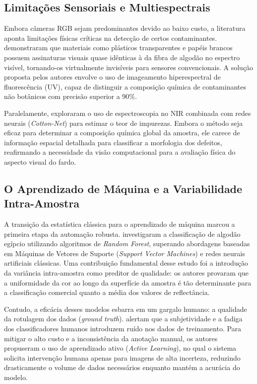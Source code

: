 \subsection{Limitações Sensoriais e Multiespectrais}

    Embora câmeras RGB sejam predominantes devido ao baixo custo, a literatura aponta limitações físicas críticas na detecção de certos contaminantes.  demonstraram que materiais como plásticos transparentes e papéis brancos possuem assinaturas visuais quase idênticas à da fibra de algodão no espectro visível, tornando-os virtualmente invisíveis para sensores convencionais. A solução proposta pelos autores envolve o uso de imageamento hiperespectral de fluorescência (UV), capaz de distinguir a composição química de contaminantes não botânicos com precisão superior a 90\%.

    Paralelamente,  exploraram o uso de espectroscopia no NIR combinada com redes neurais (\textit{Cotton-Net}) para estimar o teor de impurezas. Embora o método seja eficaz para determinar a composição química global da amostra, ele carece de informação espacial detalhada para classificar a morfologia dos defeitos, reafirmando a necessidade da visão computacional para a avaliação física do aspecto visual do fardo.

\subsection{O Aprendizado de Máquina e a Variabilidade Intra-Amostra}

    A transição da estatística clássica para o aprendizado de máquina marcou a primeira etapa da automação robusta.  investigaram a classificação de algodão egípcio utilizando algoritmos de \textit{Random Forest}, superando abordagens baseadas em Máquinas de Vetores de Suporte (\textit{Support Vector Machines}) e redes neurais artificiais clássicas. Uma contribuição fundamental desse estudo foi a introdução da variância intra-amostra como preditor de qualidade: os autores provaram que a uniformidade da cor ao longo da superfície da amostra é tão determinante para a classificação comercial quanto a média dos valores de reflectância.

    Contudo, a eficácia desses modelos esbarra em um gargalo humano: a qualidade da rotulagem dos dados (\textit{ground truth}).  alertam que a subjetividade e a fadiga dos classificadores humanos introduzem ruído nos dados de treinamento. Para mitigar o alto custo e a inconsistência da anotação manual, os autores propuseram o uso de aprendizado ativo (\textit{Active Learning}), no qual o sistema solicita intervenção humana apenas para imagens de alta incerteza, reduzindo drasticamente o volume de dados necessários enquanto mantém a acurácia do modelo.

